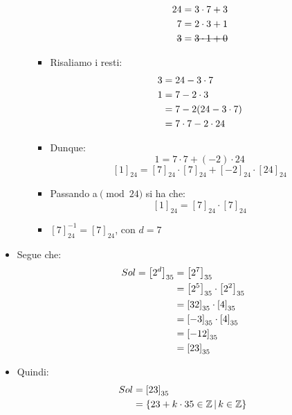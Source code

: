 \documentclass[10pt]{article}
\begin{document}
\begin{itemize}
\begin{enumerate}
\begin{itemize}
\begin{equation}
\begin{split}
		24 &= 3 \cdot 7 + 3 \\
		7 &= 2 \cdot 3 + 1 \\
		\hbox{\sout{$3$}} &= \hbox{\sout{$3 \cdot 1 + 0$}}		
		\notag
		\end{split}
		\end{equation}
		\item 
		Risaliamo i resti:
		\begin{equation}
		\begin{split}
		3 &= 24 - 3 \cdot 7 \\
		1 &= 7 - 2 \cdot 3 \\
		&= 7 - 2(24-3 \cdot 7) \\		
		&= 7 \cdot 7 - 2 \cdot 24	
		\notag					
		\end{split}
		\end{equation}
		\item
		Dunque: 
		$$1 = 7 \cdot 7 + (-2) \cdot 24$$
		$$\left[1\right]_{24} = \left[7\right]_{24} \cdot \left[7\right]_{24} + \left[-2\right]_{24} \cdot \left[24\right]_{24}$$
		\item
		Passando a$\pmod{24}$ si ha che:
		$$\left[1\right]_{24} = \left[7\right]_{24} \cdot \left[7\right]_{24}$$
		\item
		$\left[7\right]_{24}^{-1} = \left[7\right]_{24}$, con $d=7$
		\end{itemize}
		\end{enumerate}
		\smallskip \smallskip
		\item
		Segue che:
		\begin{equation}
		\begin{split}
		Sol = \left[2^d\right]_{35} &= \left[2^7\right]_{35}\\
		&= \left[2^5\right]_{35} \cdot \left[2^2\right]_{35}\\
		&= \left[32\right]_{35} \cdot \left[4\right]_{35}\\
		&= \left[-3\right]_{35} \cdot \left[4\right]_{35}\\
		&= \left[-12\right]_{35}\\
		&= \left[23\right]_{35}
		\notag
		\end{split}
		\end{equation}
		\item
		Quindi:
		\begin{equation}
		\begin{split}
		Sol &= \left[23\right]_{35} \\
		&= \{23 + k \cdot 35 \in \mathbb{Z} \,|\, k \in \mathbb{Z}\}
		\notag
		\end{split}
		\end{equation}
	\end{itemize}
	
\end{document}

